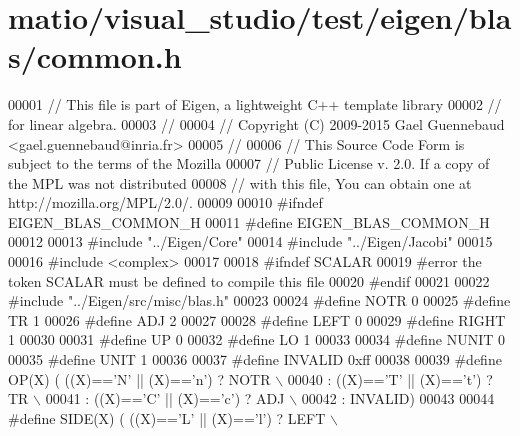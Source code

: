 \hypertarget{matio_2visual__studio_2test_2eigen_2blas_2common_8h_source}{}\section{matio/visual\+\_\+studio/test/eigen/blas/common.h}
\label{matio_2visual__studio_2test_2eigen_2blas_2common_8h_source}

\begin{DoxyCode}
00001 \textcolor{comment}{// This file is part of Eigen, a lightweight C++ template library}
00002 \textcolor{comment}{// for linear algebra.}
00003 \textcolor{comment}{//}
00004 \textcolor{comment}{// Copyright (C) 2009-2015 Gael Guennebaud <gael.guennebaud@inria.fr>}
00005 \textcolor{comment}{//}
00006 \textcolor{comment}{// This Source Code Form is subject to the terms of the Mozilla}
00007 \textcolor{comment}{// Public License v. 2.0. If a copy of the MPL was not distributed}
00008 \textcolor{comment}{// with this file, You can obtain one at http://mozilla.org/MPL/2.0/.}
00009 
00010 \textcolor{preprocessor}{#ifndef EIGEN\_BLAS\_COMMON\_H}
00011 \textcolor{preprocessor}{#define EIGEN\_BLAS\_COMMON\_H}
00012 
00013 \textcolor{preprocessor}{#include "../Eigen/Core"}
00014 \textcolor{preprocessor}{#include "../Eigen/Jacobi"}
00015 
00016 \textcolor{preprocessor}{#include <complex>}
00017 
00018 \textcolor{preprocessor}{#ifndef SCALAR}
00019 \textcolor{preprocessor}{#error the token SCALAR must be defined to compile this file}
00020 \textcolor{preprocessor}{#endif}
00021 
00022 \textcolor{preprocessor}{#include "../Eigen/src/misc/blas.h"}
00023 
00024 \textcolor{preprocessor}{#define NOTR    0}
00025 \textcolor{preprocessor}{#define TR      1}
00026 \textcolor{preprocessor}{#define ADJ     2}
00027 
00028 \textcolor{preprocessor}{#define LEFT    0}
00029 \textcolor{preprocessor}{#define RIGHT   1}
00030 
00031 \textcolor{preprocessor}{#define UP      0}
00032 \textcolor{preprocessor}{#define LO      1}
00033 
00034 \textcolor{preprocessor}{#define NUNIT   0}
00035 \textcolor{preprocessor}{#define UNIT    1}
00036 
00037 \textcolor{preprocessor}{#define INVALID 0xff}
00038 
00039 \textcolor{preprocessor}{#define OP(X)   (   ((X)=='N' || (X)=='n') ? NOTR   \(\backslash\)}
00040 \textcolor{preprocessor}{                  : ((X)=='T' || (X)=='t') ? TR     \(\backslash\)}
00041 \textcolor{preprocessor}{                  : ((X)=='C' || (X)=='c') ? ADJ    \(\backslash\)}
00042 \textcolor{preprocessor}{                  : INVALID)}
00043 
00044 \textcolor{preprocessor}{#define SIDE(X) (   ((X)=='L' || (X)=='l') ? LEFT   \(\backslash\)}

\end{DoxyCode}
